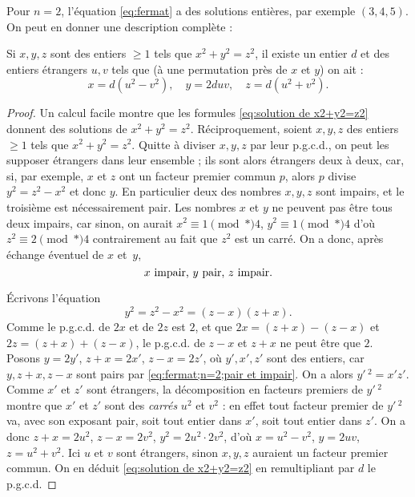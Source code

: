 \documentclass[11pt, %
  title in boldface,
  theorem in new line,
  theorem numbering = section,
  number theorems separately,
  simple name,
]{beaulivre}
\begin{document}
    Pour \( n = 2 \), l'équation \eqref{eq:fermat} a des solutions entières, par exemple \( (3,4,5) \). On peut en donner une description complète :

    \begin{theorem}\label{thm:eq.fermat;n=2}
        Si \( x,y,z \) sont des entiers \( \geqslant 1 \) tels que \( x^2+y^2=z^2 \), il existe un entier \( d \) et des entiers étrangers \( u,v \) tels que (à une permutation près de \( x \) et \( y \)) on ait :
        \begin{equation}\label{eq:solution de x2+y2=z2}
            x = d(u^2-v^2), \quad
            y = 2duv, \quad
            z = d(u^2+v^2).
        \end{equation}
    \end{theorem}
    \begin{proof}
        Un calcul facile montre que les formules \eqref{eq:solution de x2+y2=z2} donnent des solutions de \( x^2+y^2=z^2 \). Réciproquement, soient \( x,y,z \) des entiers \( \geqslant 1 \) tels que \( x^2+y^2=z^2 \). Quitte à diviser \( x,y,z \) par leur p.g.c.d., on peut les supposer étrangers dans leur ensemble ; ils sont alors étrangers deux à deux, car, si, par exemple, \( x \) et \( z \) ont un facteur premier commun \( p \), alors \( p \) divise \( y^2 = z^2-x^2 \) et donc \( y \). En particulier deux des nombres \( x,y,z \) sont impairs, et le troisième est nécessairement pair. Les nombres \( x \) et \( y \) ne peuvent pas être tous deux impairs, car sinon, on aurait \( x^2 \equiv 1 \pmod*{4} \), \( y^2 \equiv 1 \pmod*{4} \) d'où \( z^2 \equiv 2 \pmod*{4} \) contrairement au fait que \( z^2 \) est un carré. On a donc, après échange éventuel de \( x \) et~\( y \),
        \begin{equation}\label{eq:fermat;n=2;pair et impair}
            \text{\( x \) impair, \( y \) pair, \( z \) impair.}
        \end{equation}

        Écrivons l'équation
        \begin{equation}
            y^2 = z^2-x^2 = (z-x)(z+x).
        \end{equation}
        Comme le p.g.c.d. de \( 2x \) et de \( 2z \) est \( 2 \), et que \( 2x = (z+x)-(z-x) \) et \( 2z = (z+x)+(z-x) \), le p.g.c.d. de \( z-x \) et \( z+x \) ne peut être que \( 2 \). Posons \( y = 2y' \), \( z+x = 2x' \), \( z-x = 2z' \), où \( y',x',z' \) sont des entiers, car \( y, z+x, z-x \) sont pairs par \eqref{eq:fermat;n=2;pair et impair}. On a alors \( y'\,^2=x'z' \). Comme \( x' \) et \( z' \) sont étrangers, la décomposition en facteurs premiers de \( y'\,^2 \) montre que \( x' \) et \( z' \) sont des \emph{carrés} \( u^2 \) et \( v^2 \) : en effet tout facteur premier de \( y'\,^2 \) va, avec son exposant pair, soit tout entier dans \( x' \), soit tout entier dans \( z' \). On a donc \( z+x = 2u^2 \), \( z-x = 2v^2 \), \( y^2 = 2u^2 \cdot 2v^2 \), d'où \( x = u^2-v^2 \), \( y = 2uv \), \( z = u^2+v^2 \). Ici \( u \) et \( v \) sont étrangers, sinon \( x,y,z \) auraient un facteur premier commun. On en déduit \eqref{eq:solution de x2+y2=z2} en remultipliant par \( d \) le p.g.c.d.
    \end{proof}
\end{document}

